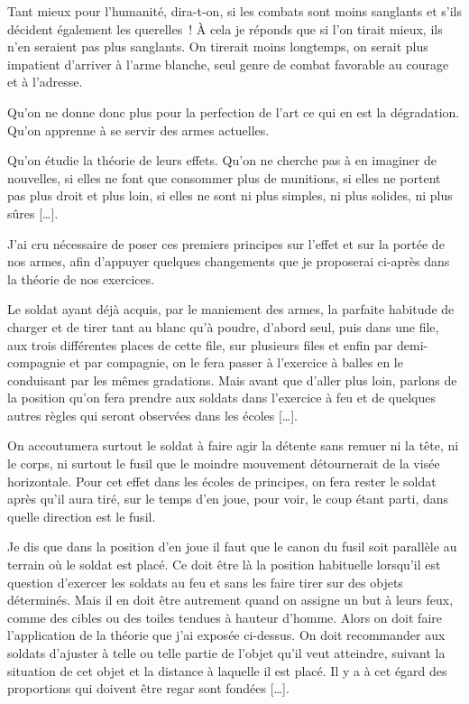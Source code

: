 \documentclass[french,twoside]{book} %
\begin{document}
Tant mieux pour l’humanité, dira-t-on, si les combats sont moins sanglants et s’ils décident également les querelles ! À cela je réponds que si l’on tirait mieux, ils n’en seraient pas plus sanglants. On tirerait moins longtemps, on serait plus impatient d’arriver à l’arme blanche, seul genre de combat favorable au courage et à l’adresse.\par
Qu’on ne donne donc plus pour la perfection de l’art ce qui en est la dégradation. Qu’on apprenne à se servir des armes actuelles.\par
Qu’on étudie la théorie de leurs effets. Qu’on ne cherche pas à en imaginer de nouvelles, si elles ne font que consommer plus de munitions, si elles ne portent pas plus droit et plus loin, si elles ne sont ni plus simples, ni plus solides, ni plus sûres […].\par
J’ai cru nécessaire de poser ces premiers principes sur l’effet et sur la portée de nos armes, afin d’appuyer quelques changements que je proposerai ci-après dans la théorie de nos exercices.\par
Le soldat ayant déjà acquis, par le maniement des armes, la parfaite habitude de charger et de tirer tant au blanc qu’à poudre, d’abord seul, puis dans une file, aux trois différentes places de cette file, sur plusieurs files et enfin par demi-compagnie et par compagnie, on le fera passer à l’exercice à balles en le conduisant par les mêmes gradations. Mais avant que d’aller plus loin, parlons de la position qu’on fera prendre aux soldats dans l’exercice à feu et de quelques autres règles qui seront observées dans les écoles […].\par
On accoutumera surtout le soldat à faire agir la détente sans remuer ni la tête, ni le corps, ni surtout le fusil que le moindre mouvement détournerait de la visée horizontale. Pour cet effet dans les écoles de principes, on fera rester le soldat après qu’il aura tiré, sur le temps d’en joue, pour voir, le coup étant parti, dans quelle direction est le fusil.\par
Je dis que dans la position d’en joue il faut que le canon du fusil soit parallèle au terrain où le soldat est placé. Ce doit être là la position habituelle lorsqu’il est question d’exercer les soldats au feu et sans les faire tirer sur des objets déterminés. Mais il en doit être autrement quand on assigne un but à leurs feux, comme des cibles ou des toiles tendues à hauteur d’homme. Alors on doit faire l’application de la théorie que j’ai exposée ci-dessus. On doit recommander aux soldats d’ajuster à telle ou telle partie de l’objet qu’il veut atteindre, suivant la situation de cet objet et la distance à laquelle il est placé. Il y a à cet égard des proportions qui doivent être regar\hyperref[bookmark11]{} \hyperref[bookmark12]{} sont fondées […].\par
\end{document}
